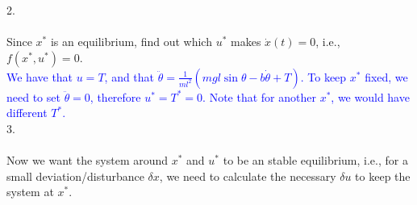 2. \\ \\
Since $x^*$ is an equilibrium, find out which $u^*$ makes $\dot x(t) = 0$, i.e., $f(x^*,u^*) = 0$. \\
\textcolor{blue}{We have that $u = T$, and that $\ddot\theta = \frac{1}{ml^2}\left(mgl\sin\theta - b\dot\theta + T\right)$. To keep $x^*$ fixed, we need to set $\ddot\theta = 0$, therefore $u^* = T^* = 0$. Note that for another $x^*$, we would have different $T^*$.} \\

3. \\ \\
Now we want the system around $x^*$ and $u^*$ to be an stable equilibrium, i.e., for a small deviation/disturbance $\delta x$, we need to calculate the necessary $\delta u$ to keep the system at $x^*$.

